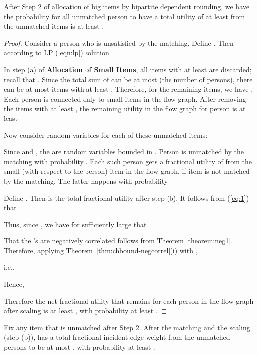 \begin{lemma}
\label{lemma:small}
After Step 2 of  allocation of big items by bipartite dependent rounding, we have the probability for all unmatched person to have a total utility of at least
 from the unmatched items is at least .
\end{lemma}


\begin{proof}
Consider a person  who is unsatisfied by the matching. Define . Then according to LP (\ref{eqn:lp}) solution



In step (a) of {\bf Allocation of Small Items}, all items  with 
 at least  are discarded; recall that . Since the total sum of  can be at most  (the number of persons), there can be at most  items with  at least . Therefore, for the remaining items, we have . Each person is connected only to small items in the flow graph. After removing the items with  at least , the remaining utility in the flow graph for person  is  at least
 
 Now consider random variables  for each of these unmatched items:


Since  and , the
 are random variables bounded in . Person  is unmatched by the matching
with probability . Each such person   gets
a fractional utility of  from the small (with respect to the person) item  in the flow graph, if item  is
not matched by the matching. The latter happens with probability .

Define . Then  is the total fractional utility after step (b). It
follows from (\ref{eq:1}) that


Thus, since , we have for sufficiently large  that


That the 's are negatively correlated follows from Theorem \ref{theorem:neg1}. Therefore, applying Theorem~\ref{thm:chbound-negcorrel}(i)
with ,

i.e.,
 

Hence,
 

Therefore the net fractional utility that remains for each person  in the flow graph after scaling is at least , with probability at least .
\end{proof}

\begin{lemma}
\label{lemma:item}
Fix any item  that is unmatched after Step 2. After the matching and the scaling (step (b)),  has a total fractional incident edge-weight
from the unmatched persons to be at most ,  with probability at least .
\end{lemma}

